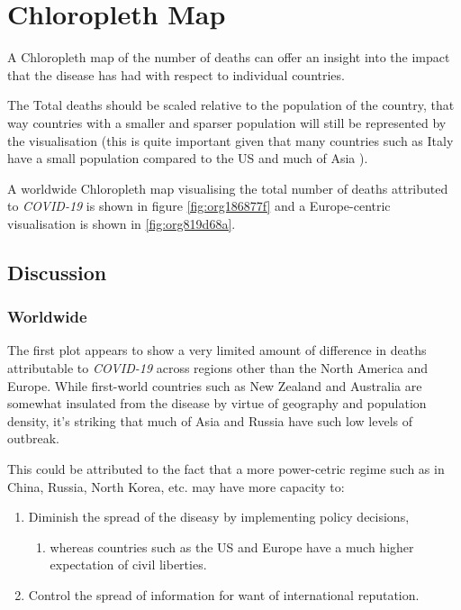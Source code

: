 \documentclass[11pt]{article}
\begin{document}
\section{Chloropleth Map}
\label{sec:org0b00a1e}
A Chloropleth map of the number of deaths can offer an insight into the impact
that the disease has had with respect to individual countries.

The Total deaths should be scaled relative to the population of the country,
that way countries with a smaller and sparser population will still be
represented by the visualisation (this is quite important given that many
countries such as Italy have a small population compared to the US and much of
Asia \cite{2020n}).

A worldwide Chloropleth map visualising the total number of deaths attributed to
\emph{COVID-19} is shown in figure \ref{fig:org186877f} and a Europe-centric visualisation is shown
in \ref{fig:org819d68a}.

\subsection{Discussion}
\label{sec:org656195d}
\subsubsection{Worldwide}
\label{sec:org659db8c}
The first plot appears to show a very limited amount of difference in deaths
attributable to \emph{COVID-19} across regions other than the North America and
Europe. While first-world countries such as New Zealand and Australia are
somewhat insulated from the disease by virtue of geography and population
density, it's striking that much of Asia and Russia have such low levels of
outbreak.

This could be attributed to the fact that a more power-cetric regime such as in
China, Russia, North Korea, etc. may have more capacity to:

\begin{enumerate}
\item Diminish the spread of the diseasy by implementing
policy decisions,
\begin{enumerate}
\item whereas countries such as the US and Europe have a much higher expectation
of civil liberties.
\end{enumerate}
\item Control the spread of information for want of international reputation.
\end{enumerate}
\end{document}
